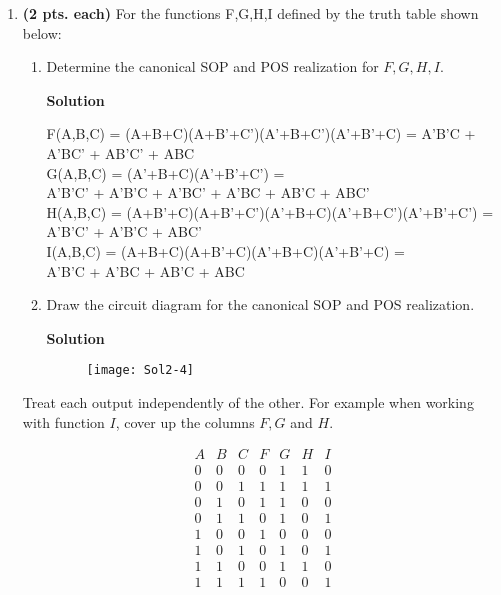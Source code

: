 \begin{enumerate}
\item \textbf{ (2 pts. each)} For the functions F,G,H,I defined by the 
truth table shown below:
\begin{enumerate}
	\item Determine the canonical SOP and POS realization for $F,G,H,I$.

	\begin{onlysolution}  \textbf{Solution} \itshape
	
F(A,B,C) = (A+B+C)(A+B'+C')(A'+B+C')(A'+B'+C)  =
A'B'C + A'BC' + AB'C' + ABC \\

G(A,B,C) = (A'+B+C)(A'+B'+C') = \\
A'B'C' + A'B'C + A'BC' + A'BC + AB'C + ABC'  \\

H(A,B,C) = (A+B'+C)(A+B'+C')(A'+B+C)(A'+B+C')(A'+B'+C') =\\
A'B'C' + A'B'C + ABC' \\

I(A,B,C) = (A+B+C)(A+B'+C)(A'+B+C)(A'+B'+C) =\\
A'B'C + A'BC + AB'C + ABC \\
\end{onlysolution}

	\item Draw the circuit diagram for the canonical SOP and POS 
		realization.

	\begin{onlysolution}  \textbf{Solution} \itshape
	\begin{figure}[ht]
	\texttt{[image: Sol2-4]}
	\end{figure}
\end{onlysolution}
\end{enumerate}
Treat each output independently of the other.  For example when
working with function $I$, cover up the columns $F,G$ and $H$.

$$\begin{array}{c|c|c||c|c|c|c}
 	A & B & C & F & G & H & I \\ \hline
 	0 & 0 & 0 & 0 & 1 & 1 & 0 \\ \hline
 	0 & 0 & 1 & 1 & 1 & 1 & 1 \\ \hline
 	0 & 1 & 0 & 1 & 1 & 0 & 0 \\ \hline
 	0 & 1 & 1 & 0 & 1 & 0 & 1 \\ \hline
 	1 & 0 & 0 & 1 & 0 & 0 & 0 \\ \hline
 	1 & 0 & 1 & 0 & 1 & 0 & 1 \\ \hline
 	1 & 1 & 0 & 0 & 1 & 1 & 0 \\ \hline
 	1 & 1 & 1 & 1 & 0 & 0 & 1 \\
\end{array}$$


\end{enumerate}

